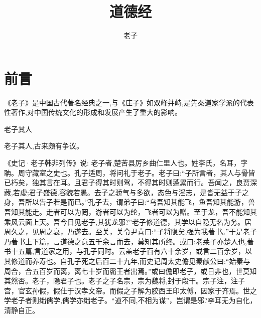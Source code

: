\documentclass[a4paper,12pt,UTF8,twoside]{ctexbook}
\title{\heiti\zihao{0} 道德经}
\author{老子}
\date{}
\begin{document}
\maketitle

\tableofcontents
	
\frontmatter
\chapter{前言}

《老子》是中国古代著名经典之一,与《庄子》如双峰并峙,是先秦道家学派的代表性著作,对中国传统文化的形成和发展产生了重大的影响。

老子其人

老子其人,古来颇有争议。

《史记·老子韩非列传》说:
老子者,楚苦县厉乡曲仁里人也。姓李氏，名耳，字聃。周守藏室之史也。孔子适周，将问礼于老子。老子曰:“子所言者，其人与骨皆已朽矣，独其言在耳。且君子得其时则驾，不得其时则蓬累而行。吾闻之，良贾深藏,若虚;君子盛德,容貌若愚。去子之骄气与多欲，态色与淫志，是皆无益于子之身，吾所以告子若是而已。”孔子去，谓弟子曰:“乌吾知其能飞，鱼吾知其能游，兽吾知其能走。走者可以为罔，游者可以为纶，飞者可以为赠。至于龙，吾不能知其乘风云面上天。吾今日见老子,其犹龙邪?”老子修道德，其学以自隐无名为务。居周久之，见周之衰，乃遂去。至关，关令尹喜曰:“子将隐矣,强为我著书。”于是老子乃著书上下篇，言道德之意五千余言而去，莫知其所终。或曰:老莱子亦楚人也,著书十五篇,言道家之用，与孔子同时。云盖老子百有六十余岁，或言二百余岁，以其修道而养寿也。自孔子死之后百二十九年,而史记周太史儋见秦献公曰:“始秦与周合，合五百岁而离，离七十岁而霸王者出焉。”或曰儋即老子，或日非也，世莫知其然否。老子，隐君子也。老子之子名宗，宗为魏将,封于段干。宗子注，注子宫，官玄孙假，假仕于汉孝文帝。而假之子解为胶西王印太傅，因家于齐焉。世之学老子者则绌儒学,儒学亦绌老子。“道不同,不相为谋”，岂谓是邪?李耳无为自化，清静自正。
\end{document}
